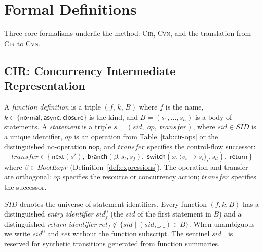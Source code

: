 \section{Formal Definitions}
\label{sec:formal-defs}

Three core formalisms underlie the method: \textsc{Cir}, \textsc{Cvn}, and the translation from \textsc{Cir} to \textsc{Cvn}.

\subsection{CIR: Concurrency Intermediate Representation}
\label{subsec:cir-def}

\begin{definition}
\label{def:statement}
A \emph{function definition} is a triple $(f,\,k,\,B)$ where $f$ is the name, $k\in\{\textsf{normal},\textsf{async},\textsf{closure}\}$ is the kind, and $B=(s_1,\dots,s_n)$ is a body of statements.
A \emph{statement} is a triple $s=(\mathit{sid},\;\mathit{op},\;\mathit{transfer})$, where $\mathit{sid}\in\mathit{SID}$ is a unique identifier, $\mathit{op}$ is an operation from Table~\ref{tab:cir-ops} or the distinguished no-operation $\textsf{nop}$, and $\mathit{transfer}$ specifies the control-flow successor:
   \[
      \mathit{transfer} \in
      \bigl\{\,
        \textsf{next}(s'),\;
        \textsf{branch}(\beta,s_t,s_f),\;
        \textsf{switch}(x,\langle v_i\!\to\!s_i\rangle_{i},s_d),\;
        \textsf{return}
      \,\bigr\}
    \]
    where $\beta\in\mathit{BoolExpr}$ (Definition~\ref{def:expressions}). The operation and transfer are orthogonal: $\mathit{op}$ specifies the resource or concurrency action; $\mathit{transfer}$ specifies the successor.
\end{definition}

$\mathit{SID}$ denotes the universe of statement identifiers. Every function $(f,k,B)$ has a distinguished \emph{entry identifier} $\mathit{sid}^{0}_{f}$ (the $\mathit{sid}$ of the first statement in $B$) and a distinguished \emph{return identifier} $\mathit{ret}_{f}\notin\{\mathit{sid}\mid(\mathit{sid},\_,\_)\in B\}$. When unambiguous we write $\mathit{sid}^{0}$ and $\mathit{ret}$ without the function subscript. The sentinel $\mathit{sid}_{\bot}$ is reserved for synthetic transitions generated from function summaries.

